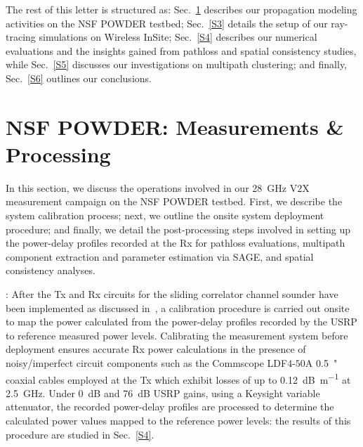\documentclass[10pt, twocolumn]{IEEEtran}
\begin{document}

The rest of this letter is structured as: Sec.~\ref{S2} describes our propagation modeling activities on the NSF POWDER testbed; Sec.~\ref{S3} details the setup of our ray-tracing simulations on Wireless InSite; Sec.~\ref{S4} describes our numerical evaluations and the insights gained from pathloss and spatial consistency studies, while Sec.~\ref{S5} discusses our investigations on multipath clustering; and finally, Sec.~\ref{S6} outlines our conclusions.
\vspace{-3mm}

\section{NSF POWDER: Measurements \& Processing}\label{S2}
In this section, we discuss the operations involved in our \SI{28}{\giga\hertz} V$2$X measurement campaign on the NSF POWDER testbed. First, we describe the system calibration process; next, we outline the onsite system deployment procedure; and finally, we detail the post-processing steps involved in setting up the power-delay profiles recorded at the Rx for pathloss evaluations, multipath component extraction and parameter estimation via SAGE, and spatial consistency analyses.

: After the Tx and Rx circuits for the sliding correlator channel sounder have been implemented as discussed in~\cite{SPAVE_ICC}, a calibration procedure is carried out onsite to map the power calculated from the power-delay profiles recorded by the USRP to reference measured power levels. Calibrating the measurement system before deployment ensures accurate Rx power calculations in the presence of noisy/imperfect circuit components such as the Commscope LDF$4$-$50$A \SI{0.5}{{"}} coaxial cables employed at the Tx which exhibit losses of up to \SI{0.12}{\deci\bel\per\meter} at \SI{2.5}{\giga\hertz}. Under \SI{0}{\deci\bel} and \SI{76}{\deci\bel} USRP gains, using a Keysight variable attenuator, the recorded power-delay profiles are processed to determine the calculated power values mapped to the reference power levels: the results of this procedure are studied in Sec.~\ref{S4}.
\end{document}
